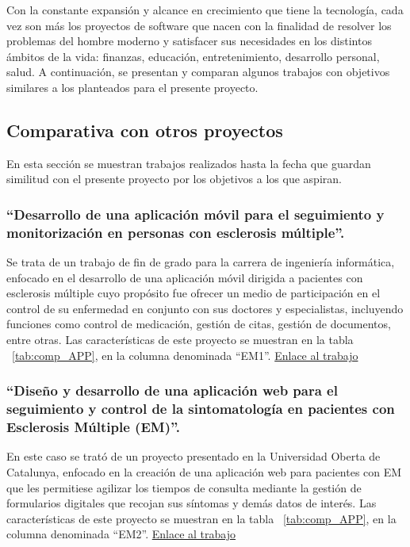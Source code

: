 
Con la constante expansión y alcance en crecimiento que tiene la tecnología, cada vez son más los proyectos de software que nacen con la finalidad de resolver los problemas del hombre moderno y satisfacer sus necesidades en los distintos ámbitos de la vida: finanzas, educación, entretenimiento, desarrollo personal, salud. A continuación, se presentan y comparan algunos trabajos con objetivos similares a los planteados para el presente proyecto.

\subsection{Comparativa con otros proyectos}
En esta sección se muestran trabajos realizados hasta la fecha que guardan similitud con el presente proyecto por los objetivos a los que aspiran.

\subsubsection{“Desarrollo de una aplicación móvil para el seguimiento y monitorización en personas con esclerosis múltiple”.}
Se trata de un trabajo de fin de grado para la carrera de ingeniería informática, enfocado en el desarrollo de una aplicación móvil dirigida a pacientes con esclerosis múltiple cuyo propósito fue ofrecer un medio de participación en el control de su enfermedad en conjunto con sus doctores y especialistas, incluyendo funciones como control de medicación, gestión de citas, gestión de documentos, entre otras. Las características de este proyecto se muestran en la tabla ~\ref{tab:comp_APP}, en la columna denominada “EM1”.
\href{https://riunet.upv.es/handle/10251/188415}{Enlace al trabajo}

\subsubsection{“Diseño y desarrollo de una aplicación web para el seguimiento y control de la sintomatología en pacientes con Esclerosis Múltiple (EM)”.}
En este caso se trató de un proyecto presentado en la Universidad Oberta de Catalunya, enfocado en la creación de una aplicación web para pacientes con EM que les permitiese agilizar los tiempos de consulta mediante la gestión de formularios digitales que recojan sus síntomas y demás datos de interés. Las características de este proyecto se muestran en la tabla ~\ref{tab:comp_APP}, en la columna denominada “EM2”.
\href{https://openaccess.uoc.edu/handle/10609/147240}{Enlace al trabajo}

